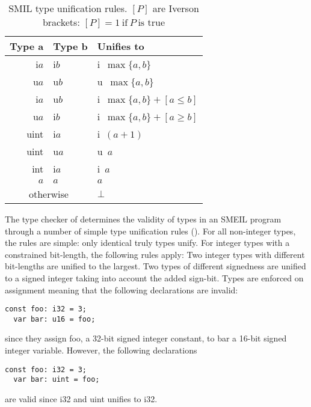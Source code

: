 \begin{table}
  \centering
  \begin{tabular}{rll}
    \toprule
    Type a & Type b & Unifies to \\
    \midrule
    i$a$ & i$b$ & i~$\max\{a, b\}$\\
    u$a$ & u$b$ & u~$\max\{a, b\} $\\
    i$a$ & u$b$ & i~$\max\{a, b\} + [a \leq b]$\\
    u$a$ & i$b$ & i~$\max\{a, b\} + [a \geq b]$\\
    uint & i$a$ & i~$(a + 1)$\\
    uint & u$a$ & u~$a$\\
    int & i$a$ & i~$a$\\
    $a$ & $a$ & $a$ \\
    \multicolumn{2}{c}{otherwise} & $\bot$\\
    \bottomrule
  \end{tabular}
  \caption{SMIL type unification rules. $[P]$ are Iverson brackets:
    $[P] = 1~\text{if}~P~\text{is true}$}
  \label{tab:typeuni}
\end{table}

  

The type checker of \libsme{} determines the validity of types in an SMEIL
program through a number of simple type unification rules
(). For all non-integer types, the rules are simple: only
identical truly types unify. For integer types with a constrained bit-length,
the following rules apply: Two integer types with different bit-lengths are
unified to the largest.  Two types of different signedness are unified to a
signed integer taking into account the added sign-bit. Types are enforced on
assignment meaning that the following declarations are invalid:
\begin{lstlisting}[language=smeil]
  const foo: i32 = 3;
  var bar: u16 = foo;
\end{lstlisting}
since they assign {\ttfamily foo}, a 32-bit signed integer constant, to {\ttfamily bar} a
16-bit signed integer variable. However, the following declarations
\begin{lstlisting}[language=smeil]
  const foo: i32 = 3;
  var bar: uint = foo;
\end{lstlisting}
are valid since {\ttfamily i32} and {\ttfamily uint} unifies to {\ttfamily i32}.



